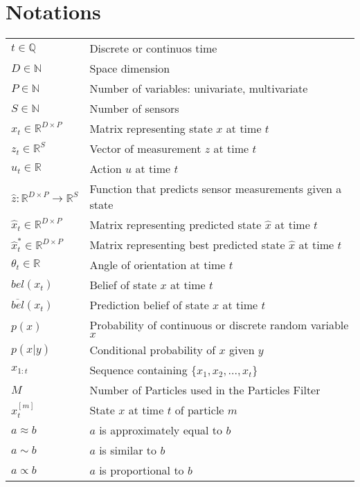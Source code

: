 \section{Notations}
\begin{flushleft}
\begin{tabular}{l l}

$t \in \mathbb{Q}$ & Discrete or continuos time\\
$D \in \mathbb{N}$ & Space dimension\\
$P \in \mathbb{N}$ & Number of variables: univariate, multivariate\\
$S \in \mathbb{N}$ & Number of sensors\\
$x_t \in \mathbb{R}^{D\times P}$ & Matrix representing state $x$ at time $t$\\
$z_t \in \mathbb{R}^S$  & Vector of measurement $z$ at time $t$\\
$u_t \in \mathbb{R}$ & Action $u$ at time $t$\\
$\hat z: \mathbb{R}^{D\times P}  \rightarrow \mathbb{R}^S $ & Function that predicts sensor measurements given a state\\
$\hat x_t \in \mathbb{R}^{D\times P}$ & Matrix representing predicted state $\hat x$ at time $t$\\
$\hat x_t^* \in \mathbb{R}^{D\times P}$ & Matrix representing best predicted state $\hat x$ at time $t$\\
$\theta_t \in \mathbb{R}$ & Angle of orientation at time $t$\\
$bel(x_t)$ & Belief of state $x$ at time $t$\\
$\overline{bel}(x_t)$ & Prediction belief of state $x$ at time $t$\\
$p(x)$ & Probability of continuous or discrete random variable $x$\\
$p(x | y)$ & Conditional probability of $x$ given $y$\\
$x_{1:t}$ & Sequence containing $\{x_1, x_2, ..., x_t\}$\\ 
$M$ & Number of Particles used in the Particles Filter\\
$x_t^{[m]}$ & State $x$ at time $t$ of particle $m$\\
$a \approx b$ & $a$ is approximately equal to $b$\\
$a \sim b$ & $a$ is similar to $b$\\
$a \propto b$ & $a$ is proportional to $b$\\
\end{tabular}
\end{flushleft}

